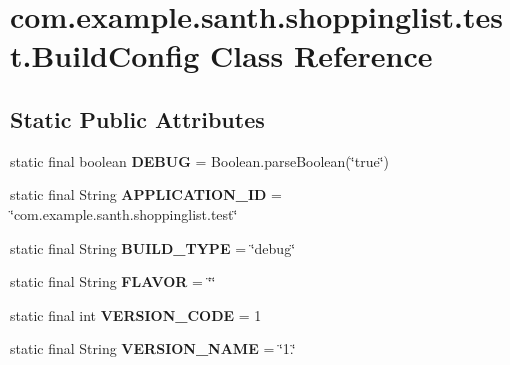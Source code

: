 \hypertarget{classcom_1_1example_1_1santh_1_1shoppinglist_1_1test_1_1_build_config}{}\section{com.\+example.\+santh.\+shoppinglist.\+test.\+Build\+Config Class Reference}
\label{classcom_1_1example_1_1santh_1_1shoppinglist_1_1test_1_1_build_config}
\subsection*{Static Public Attributes}
\begin{DoxyCompactItemize}
\item 
static final boolean {\bfseries D\+E\+B\+UG} = Boolean.\+parse\+Boolean(\char`\"{}true\char`\"{})\hypertarget{classcom_1_1example_1_1santh_1_1shoppinglist_1_1test_1_1_build_config_a7c24ed166c0396089f78bc2770d4f33e}{}\label{classcom_1_1example_1_1santh_1_1shoppinglist_1_1test_1_1_build_config_a7c24ed166c0396089f78bc2770d4f33e}

\item 
static final String {\bfseries A\+P\+P\+L\+I\+C\+A\+T\+I\+O\+N\+\_\+\+ID} = \char`\"{}com.\+example.\+santh.\+shoppinglist.\+test\char`\"{}\hypertarget{classcom_1_1example_1_1santh_1_1shoppinglist_1_1test_1_1_build_config_acb924066f3e37902a21cb050a891c3a1}{}\label{classcom_1_1example_1_1santh_1_1shoppinglist_1_1test_1_1_build_config_acb924066f3e37902a21cb050a891c3a1}

\item 
static final String {\bfseries B\+U\+I\+L\+D\+\_\+\+T\+Y\+PE} = \char`\"{}debug\char`\"{}\hypertarget{classcom_1_1example_1_1santh_1_1shoppinglist_1_1test_1_1_build_config_af9c747c6d9e70944cc3bca3ff13ccf1b}{}\label{classcom_1_1example_1_1santh_1_1shoppinglist_1_1test_1_1_build_config_af9c747c6d9e70944cc3bca3ff13ccf1b}

\item 
static final String {\bfseries F\+L\+A\+V\+OR} = \char`\"{}\char`\"{}\hypertarget{classcom_1_1example_1_1santh_1_1shoppinglist_1_1test_1_1_build_config_a2ef5ddfa2ff00e9301b33faa611d8403}{}\label{classcom_1_1example_1_1santh_1_1shoppinglist_1_1test_1_1_build_config_a2ef5ddfa2ff00e9301b33faa611d8403}

\item 
static final int {\bfseries V\+E\+R\+S\+I\+O\+N\+\_\+\+C\+O\+DE} = 1\hypertarget{classcom_1_1example_1_1santh_1_1shoppinglist_1_1test_1_1_build_config_a6d67084e34180245d4fadf196e3df024}{}\label{classcom_1_1example_1_1santh_1_1shoppinglist_1_1test_1_1_build_config_a6d67084e34180245d4fadf196e3df024}

\item 
static final String {\bfseries V\+E\+R\+S\+I\+O\+N\+\_\+\+N\+A\+ME} = \char`\"{}1.\char`\"{}\hypertarget{classcom_1_1example_1_1santh_1_1shoppinglist_1_1test_1_1_build_config_a3595d6d58bc175239446c1a2d5f74e12}{}\label{classcom_1_1example_1_1santh_1_1shoppinglist_1_1test_1_1_build_config_a3595d6d58bc175239446c1a2d5f74e12}

\end{DoxyCompactItemize}


